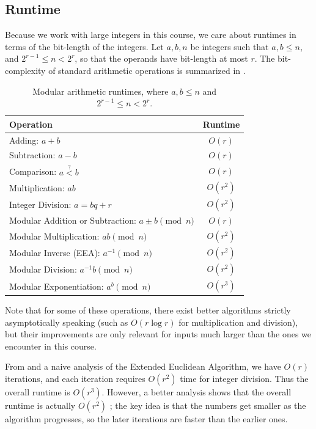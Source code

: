 \subsection*{Runtime}

Because we work with large integers in this course, we care about runtimes in terms of the bit-length of the integers.
Let \(a, b, n\) be integers such that \(a, b \leq n\), and \(2^{r-1} \leq n < 2^r\), so that the operands have bit-length at most \(r\).
The bit-complexity of standard arithmetic operations is summarized in .

\begin{table}[ht]
    \centering
    \begin{tabular}{lc}
        \toprule
        Operation & Runtime \\
        \midrule
        Adding: \(a + b\) & \(O(r)\) \\
        Subtraction: \(a - b\) & \(O(r)\) \\
        Comparison: \(a \overset{?}{<} b\) & \(O(r)\) \\
        Multiplication: \(ab\) & \(O(r^2)\) \\
        Integer Division: \(a = bq + r\) & \(O(r^2)\) \\
        \midrule
        Modular Addition or Subtraction: \(a \pm b \pmod n\) & \(O(r)\) \\
        Modular Multiplication: \(ab \pmod n\) & \(O(r^2)\) \\
        Modular Inverse (EEA): \(a^{-1} \pmod n\) & \(O(r^2)\) \\
        Modular Division: \(a^{-1} b \pmod n\) & \(O(r^2)\) \\
        Modular Exponentiation: \(a^b \pmod n\) & \(O(r^3)\) \\
        \bottomrule
    \end{tabular}
    \caption{Modular arithmetic runtimes, where \(a, b \leq n\) and \(2^{r-1} \leq n < 2^r\).}
    \label{tab:arithmetic_runtimes}
\end{table}

Note that for some of these operations, there exist better algorithms strictly asymptotically speaking (such as \(O(r \log r)\) for multiplication and division), but their improvements are only relevant for inputs much larger than the ones we encounter in this course.

From  and a naive analysis of the Extended Euclidean Algorithm, we have \(O(r)\) iterations, and each iteration requires \(O(r^2)\) time for integer division. Thus the overall runtime is \(O(r^3)\).
However, a better analysis shows that the overall runtime is actually \(O(r^2)\) \cite{Collins74}; the key idea is that the numbers get smaller as the algorithm progresses, so the later iterations are faster than the earlier ones.